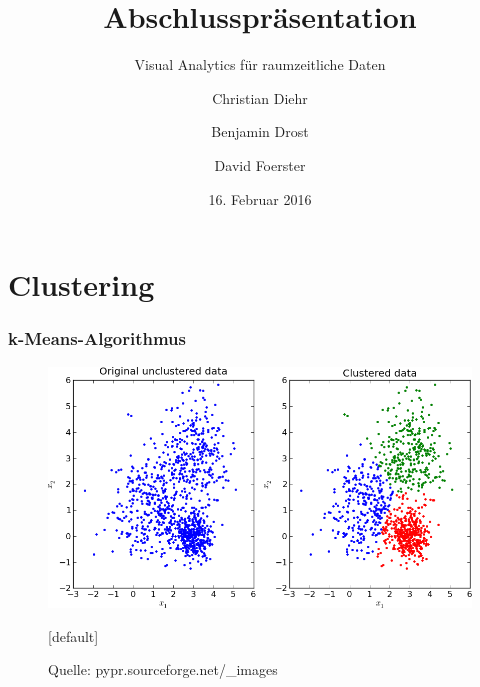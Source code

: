 \documentclass{beamer}
\title{Abschlusspräsentation}
\subtitle{Visual Analytics für raumzeitliche Daten}
\author{Christian Diehr \and Benjamin Drost \and David Foerster}
\institute{Institut für Informatik\\Humboldt-Universität zu Berlin}
\date{16. Februar 2016}
\begin{document}
    \begin{frame}
        \titlepage
    \end{frame}
    \logo %
        
    \section{Clustering}
    \begin{frame}
			\frametitle{k-Means-Algorithmus}
			\begin{figure}
				\centering\includegraphics[width=.7\textwidth]{kmeans.png}
				\caption{Quelle: pypr.sourceforge.net/\_images}
				[default]
			\end{figure}
    \end{frame}
    
\end{document}
